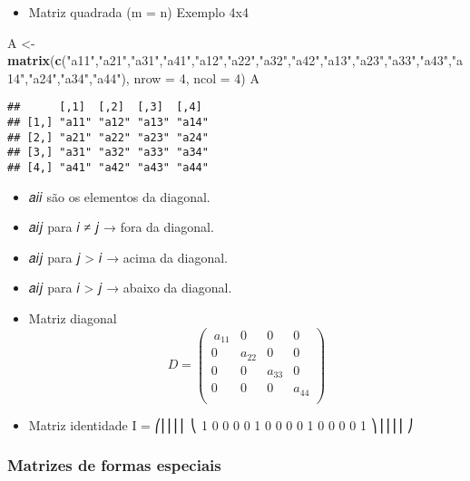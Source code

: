 \documentclass[
]{article}
\newenvironment{Shaded}{\begin{snugshade}}{\end{snugshade}}
\newcommand{\AttributeTok}[1]{\textcolor[rgb]{0.13,0.29,0.53}{#1}}
\newcommand{\DecValTok}[1]{\textcolor[rgb]{0.00,0.00,0.81}{#1}}
\newcommand{\FunctionTok}[1]{\textcolor[rgb]{0.13,0.29,0.53}{\textbf{#1}}}
\newcommand{\NormalTok}[1]{#1}
\newcommand{\OtherTok}[1]{\textcolor[rgb]{0.56,0.35,0.01}{#1}}
\newcommand{\StringTok}[1]{\textcolor[rgb]{0.31,0.60,0.02}{#1}}
\providecommand{\tightlist}{%
  \setlength{\itemsep}{0pt}\setlength{\parskip}{0pt}}
\begin{document}
\begin{itemize}
\tightlist
\item
  Matriz quadrada (m = n) Exemplo 4x4
\end{itemize}

\begin{Shaded}
\begin{Highlighting}[]
\NormalTok{A }\OtherTok{\textless{}{-}} \FunctionTok{matrix}\NormalTok{(}\FunctionTok{c}\NormalTok{(}\StringTok{"a11"}\NormalTok{,}\StringTok{"a21"}\NormalTok{,}\StringTok{"a31"}\NormalTok{,}\StringTok{"a41"}\NormalTok{,}\StringTok{"a12"}\NormalTok{,}\StringTok{"a22"}\NormalTok{,}\StringTok{"a32"}\NormalTok{,}\StringTok{"a42"}\NormalTok{,}\StringTok{"a13"}\NormalTok{,}\StringTok{"a23"}\NormalTok{,}\StringTok{"a33"}\NormalTok{,}\StringTok{"a43"}\NormalTok{,}\StringTok{"a14"}\NormalTok{,}\StringTok{"a24"}\NormalTok{,}\StringTok{"a34"}\NormalTok{,}\StringTok{"a44"}\NormalTok{), }\AttributeTok{nrow =} \DecValTok{4}\NormalTok{, }\AttributeTok{ncol =} \DecValTok{4}\NormalTok{)}
\NormalTok{A}
\end{Highlighting}
\end{Shaded}

\begin{verbatim}
##      [,1]  [,2]  [,3]  [,4] 
## [1,] "a11" "a12" "a13" "a14"
## [2,] "a21" "a22" "a23" "a24"
## [3,] "a31" "a32" "a33" "a34"
## [4,] "a41" "a42" "a43" "a44"
\end{verbatim}

\begin{itemize}
\item
  𝑎𝑖𝑖 são os elementos da diagonal.
\item
  𝑎𝑖𝑗 para 𝑖 ≠ 𝑗 → fora da diagonal.
\item
  𝑎𝑖𝑗 para 𝑗 \textgreater{} 𝑖 → acima da diagonal.
\item
  𝑎𝑖𝑗 para 𝑖 \textgreater{} 𝑗 → abaixo da diagonal.
\item
  Matriz diagonal \[D = \begin{pmatrix}\
  a_{11} & 0 & 0 & 0\\
  0 & a_{22} & 0 & 0\\
  0 & 0 & a_{33} & 0 \\
  0 & 0 & 0 & a_{44}\\
  \end{pmatrix}\]
\item
  Matriz identidade I = ⎛⎜⎜⎜⎜ ⎝ 1 0 0 0 0 1 0 0 0 0 1 0 0 0 0 1 ⎞⎟⎟⎟⎟ ⎠
\end{itemize}

\hypertarget{matrizes-de-formas-especiais-1}{%
\subsubsection{Matrizes de formas
especiais}\label{matrizes-de-formas-especiais-1}}
\end{document}
